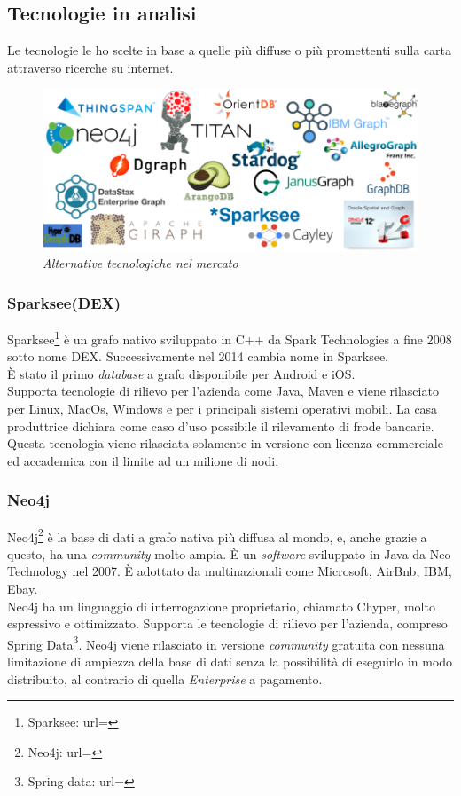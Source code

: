\subsection{Tecnologie in analisi}
Le tecnologie le ho scelte in base a quelle più diffuse o più promettenti sulla carta attraverso ricerche su internet.
\begin{figure}[h!]
	\centering
	\includegraphics[scale=0.35]{immagini/graphdb.png}

	\caption{\textit{Alternative tecnologiche nel mercato }}
\end{figure}

\subsubsection{Sparksee(DEX)}
Sparksee\footnote{Sparksee: url= } è un grafo nativo sviluppato in C++ da Spark Technologies a fine 2008 sotto nome DEX. Successivamente nel 2014 cambia nome in Sparksee.\\
È stato il primo \textit{database} a grafo disponibile per Android e iOS.\\
Supporta tecnologie di rilievo per l'azienda come Java, Maven e viene rilasciato per Linux, MacOs, Windows e per i principali sistemi operativi mobili.
La casa produttrice dichiara come caso d'uso possibile il rilevamento di frode bancarie.\\
Questa tecnologia viene rilasciata solamente in versione con licenza commerciale ed accademica con il limite ad un milione di nodi.

\subsubsection{Neo4j}
Neo4j\footnote{Neo4j: url= } è la base di dati a \gls{grafo nativa} più diffusa al mondo, e, anche grazie a questo, ha una \textit{community} molto ampia. È un \textit{software} sviluppato in Java da Neo Technology nel 2007. È adottato da multinazionali come Microsoft, AirBnb, IBM, Ebay.\\
Neo4j ha un linguaggio di interrogazione proprietario, chiamato Chyper, molto espressivo e ottimizzato. Supporta le tecnologie di rilievo per l'azienda, compreso Spring Data\footnote{Spring data: url= }. Neo4j viene rilasciato in versione \textit{community} gratuita con nessuna limitazione di ampiezza della base di dati senza la possibilità di eseguirlo in modo distribuito, al contrario di quella \textit{Enterprise} a pagamento.

